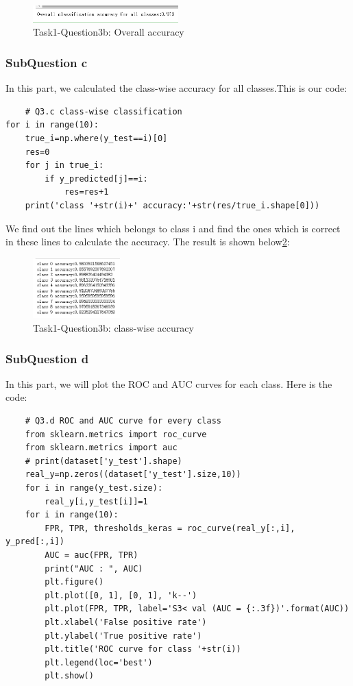 \documentclass[conference]{IEEEtran}
\begin{document}
\begin{figure}[h] 
    \centering
    \includegraphics[width=0.5\textwidth]{T1Q3b.png}
    \caption{Task1-Question3b: Overall accuracy} 
    \label{Fig.t1q3b} 
\end{figure}
\subsubsection{SubQuestion c}
In this part, we calculated the class-wise accuracy for all classes.This is our code:
\begin{lstlisting}
    # Q3.c class-wise classification
for i in range(10):
    true_i=np.where(y_test==i)[0]
    res=0
    for j in true_i:
        if y_predicted[j]==i:
            res=res+1
    print('class '+str(i)+' accuracy:'+str(res/true_i.shape[0]))
\end{lstlisting}
We find out the lines which belongs to class i and find the ones which is correct in these lines to calculate the accuracy.
The result is shown below\ref{Fig.t1q3c}:
\begin{figure}[h] 
    \centering
    \includegraphics[width=0.3\textwidth]{T1Q3c.png}
    \caption{Task1-Question3b: class-wise accuracy} 
    \label{Fig.t1q3c} 
\end{figure}

\subsubsection{SubQuestion d}
In this part, we will plot the ROC and AUC curves for each class.
Here is the code:
\begin{lstlisting}
    # Q3.d ROC and AUC curve for every class
    from sklearn.metrics import roc_curve
    from sklearn.metrics import auc
    # print(dataset['y_test'].shape)
    real_y=np.zeros((dataset['y_test'].size,10))
    for i in range(y_test.size):
        real_y[i,y_test[i]]=1
    for i in range(10):
        FPR, TPR, thresholds_keras = roc_curve(real_y[:,i], y_pred[:,i])   
        AUC = auc(FPR, TPR)
        print("AUC : ", AUC)
        plt.figure()
        plt.plot([0, 1], [0, 1], 'k--')
        plt.plot(FPR, TPR, label='S3< val (AUC = {:.3f})'.format(AUC))
        plt.xlabel('False positive rate')
        plt.ylabel('True positive rate')
        plt.title('ROC curve for class '+str(i))
        plt.legend(loc='best')
        plt.show()   
\end{lstlisting}
\end{document}
